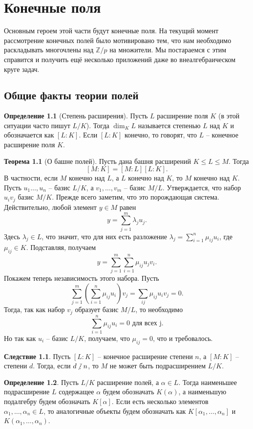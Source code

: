 \documentclass[10pt,a4paper,oneside]{book}
\theoremstyle{definition}
\newtheorem*{defn}{{\color{yellow!30!red} Определение}}
\newtheorem{thm}{{\color{red!40!black} Теорема}}
\newtheorem{cor}{Следствие}
\newcommand{\mb}[1]{\mathbb{#1}}
\newcommand{\ndi}{\mathop{\not\scalebox{0.85}{\raisebox{-1.2pt}[0.5\height]{\vdots}}\,}}
\def\thrm{\begin{thm}}
\def\ethrm{\end{thm}}
\def\dfn{\begin{defn}}
\def\edfn{\end{defn}}
\def\crl{\begin{cor}}
\def\ecrl{\end{cor}}
\begin{document}
\chapter{Конечные поля}
Основным героем этой части будут конечные поля. На текущий момент рассмотрение конечных полей было мотивировано тем, что нам необходимо раскладывать многочлены над $\mb Z/p$ на множители. Мы постараемся с этим справится и получить ещё несколько приложений даже во внеалгебраическом круге задач.


\section{Общие факты теории полей}
\dfn[Степень расширения] Пусть $L$ расширение поля $K$ (в этой ситуации часто пишут $L/K$). Тогда $\dim_K L$ называется степенью $L$ над $K$ и обозначается как $[L:K]$. Если $[L: K]$ конечно, то говорят, что $L$ -- конечное расширение поля $K$. 
\edfn

\thrm[О башне полей] Пусть дана башня расширений $K\leq L \leq M$. Тогда 
$$[M: K]=[M: L][L: K].$$
В частности, если $M$ конечно над $L$, а $L$ конечно над $K$, то $M$ конечно над $K$.
\proof Пусть $u_1\dots,u_n$ -- базис $L/K$, а $v_1,\dots,v_m$ -- базис $M/L$. Утверждается, что набор $u_iv_j$ базис $M/K$.
Прежде всего заметим, что это порождающая система. Действительно, любой элемент $y\in M$ равен 
$$y=\sum_{j=1}^m \lambda_j u_j. $$
Здесь $\lambda_j \in L$, что значит, что для них есть разложение $\lambda_j=\sum_{i=1}^n \mu_{ij} u_i$, где $\mu_{ij}\in K$. Подставляя, получаем 
$$ y=\sum_{j=1}^m\sum_{i=1}^n \mu_{ij} u_jv_i.$$
Покажем теперь независимость этого набора. Пусть
$$\sum_{j=1}^m\left(\sum_{i=1}^n \mu_{ij}u_i\right)v_j=\sum_{ij}\mu_{ij} u_i v_j=0.$$
Тогда, так как набор $v_j$ образует базис $M/L$, то необходимо
$$\sum_{i=1}^n \mu_{ij}u_i=0 \text{ для всех j}.$$
Но так как $u_i$ -- базис $L/K$, получаем, что $\mu_{ij}=0$, что и требовалось.
\endproof
\ethrm

\crl Пусть $[L: K]$ -- конечное расширение степени $n$, а $[M:K]$ -- степени $d$. Тогда, если $d \ndi n$, то $M$ не может быть подрасширением $L/K$.
\ecrl

\dfn Пусть $L/K$ расширение полей, а $\alpha \in L$. Тогда наименьшее подрасширение $L$ содержащее $\alpha$ будем обозначать $K(\alpha)$, а наименьшую подалгебру будем обозначать $K[\alpha]$. Если есть несколько элементов $\alpha_1,\dots,\alpha_n\in L$, то аналогичные объекты будем обозначать как $K[\alpha_1,\dots,\alpha_n]$ и $K(\alpha_1,\dots,\alpha_n)$.
\edfn
\end{document}
